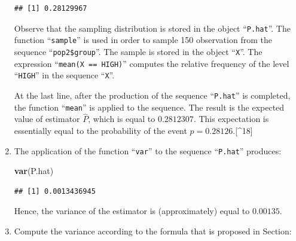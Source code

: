 \documentclass[]{krantz}
\makeatletter
\newenvironment{Shaded}{\begin{snugshade}}{\end{snugshade}}
\newcommand{\KeywordTok}[1]{\textcolor[rgb]{0.13,0.29,0.53}{\textbf{#1}}}
\newcommand{\DecValTok}[1]{\textcolor[rgb]{0.00,0.00,0.81}{#1}}
\newcommand{\StringTok}[1]{\textcolor[rgb]{0.31,0.60,0.02}{#1}}
\newcommand{\ControlFlowTok}[1]{\textcolor[rgb]{0.13,0.29,0.53}{\textbf{#1}}}
\newcommand{\OperatorTok}[1]{\textcolor[rgb]{0.81,0.36,0.00}{\textbf{#1}}}
\newcommand{\NormalTok}[1]{#1}
\newenvironment{kframe}{%
\medskip{}
\setlength{\fboxsep}{.8em}
 \def\at@end@of@kframe{}%
 \ifinner\ifhmode%
  \def\at@end@of@kframe{\end{minipage}}%
  \begin{minipage}{\columnwidth}%
 \fi\fi%
 \def\FrameCommand##1{\hskip\@totalleftmargin \hskip-\fboxsep
 \colorbox{shadecolor}{##1}\hskip-\fboxsep
     \hskip-\linewidth \hskip-\@totalleftmargin \hskip\columnwidth}%
 \MakeFramed {\advance\hsize-\width
   \@totalleftmargin\z@ \linewidth\hsize
   \@setminipage}}%
 {\par\unskip\endMakeFramed%
 \at@end@of@kframe}
\renewenvironment{Shaded}{\begin{kframe}}{\end{kframe}}
\theoremstyle{definition}
\theoremstyle{definition}
\theoremstyle{definition}
\theoremstyle{remark}
\makeatother
\begin{document}
\begin{enumerate}
\begin{Shaded}
\end{Shaded}

\begin{verbatim}
## [1] 0.28129967
\end{verbatim}

  Observe that the sampling distribution is stored in the object
  ``\texttt{P.hat}''. The function ``\texttt{sample}'' is used in order
  to sample 150 observation from the sequence ``\texttt{pop2\$group}''.
  The sample is stored in the object ``\texttt{X}''. The expression
  ``\texttt{mean(X\ ==\ HIGH)}'' computes the relative frequency of the
  level ``\texttt{HIGH}'' in the sequence ``\texttt{X}''.

  At the last line, after the production of the sequence
  ``\texttt{P.hat}'' is completed, the function ``\texttt{mean}'' is
  applied to the sequence. The result is the expected value of estimator
  \(\hat P\), which is equal to \(0.2812307\). This expectation is
  essentially equal to the probability of the event
  \(p = 0.28126\).{[}\^{}18{]}
\item
  The application of the function ``\texttt{var}'' to the sequence
  ``\texttt{P.hat}'' produces:

\begin{Shaded}
\begin{Highlighting}[]
\KeywordTok{var}\NormalTok{(P.hat)}
\end{Highlighting}
\end{Shaded}

\begin{verbatim}
## [1] 0.0013436945
\end{verbatim}

  Hence, the variance of the estimator is (approximately) equal to
  \(0.00135\).
\item
  Compute the variance according to the formula that is proposed in
  Section:


\end{enumerate}
\end{document}
